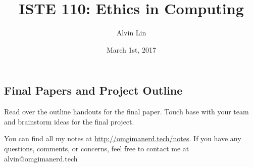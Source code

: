 \documentclass[letterpaper, 12pt]{article}
\title{ISTE 110: Ethics in Computing}
\author{Alvin Lin}
\date{March 1st, 2017}
\begin{document}
\maketitle

\subsection*{Final Papers and Project Outline}
Read over the outline handouts for the final paper.
Touch base with your team and brainstorm ideas for the final project.

\begin{center}
  You can find all my notes at \url{http://omgimanerd.tech/notes}. If you have
  any questions, comments, or concerns, feel free to contact me at
  alvin@omgimanerd.tech
\end{center}
\end{document}
